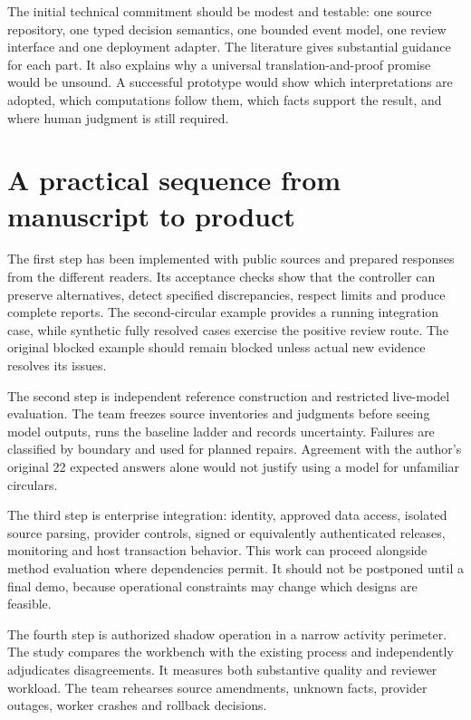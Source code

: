 The initial technical commitment should be modest and testable: one source
repository, one typed decision semantics, one bounded event model, one review
interface and one deployment adapter. The literature gives substantial guidance
for each part. It also explains why a universal translation-and-proof promise
would be unsound. A successful prototype would show which interpretations are
adopted, which computations follow them, which facts support the result, and where
human judgment is still required.

\section{A practical sequence from manuscript to product}
\label{merge:M10:14}


The first step has been implemented with public sources and prepared responses
from the different readers. Its acceptance checks show that the controller can preserve alternatives, detect
specified discrepancies, respect limits and produce complete reports. The
second-circular example provides a running integration case, while synthetic
fully resolved cases exercise the positive review route. The original blocked
example should remain blocked unless actual new evidence resolves its issues.

The second step is independent reference construction and restricted live-model
evaluation. The team freezes source inventories and judgments before seeing
model outputs, runs the baseline ladder and records uncertainty. Failures are
classified by boundary and used for planned repairs. Agreement with the author's original 22 expected answers alone would not justify
using a model for unfamiliar circulars.

The third step is enterprise integration: identity, approved data access, isolated
source parsing, provider controls, signed or equivalently authenticated releases,
monitoring and host transaction behavior. This work can proceed alongside method
evaluation where dependencies permit. It should not be postponed until a final
demo, because operational constraints may change which designs are feasible.


The fourth step is authorized shadow operation in a narrow activity perimeter.
The study compares the workbench with the existing process and independently
adjudicates disagreements. It measures both substantive quality and reviewer
workload. The team rehearses source amendments, unknown facts, provider outages,
worker crashes and rollback decisions.

